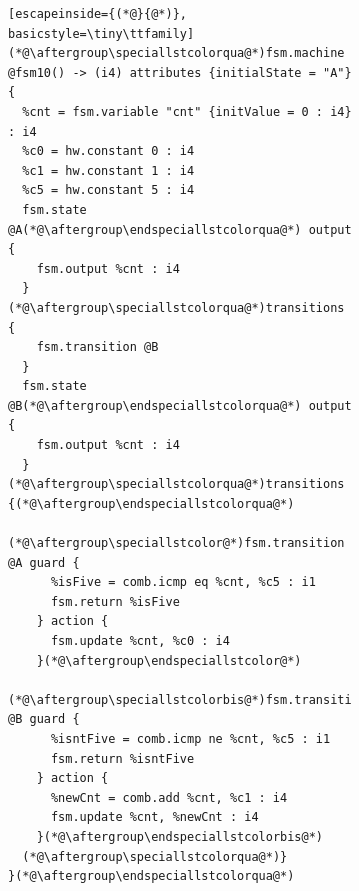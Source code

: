 \documentclass[acmsmall,screen,review]{acmart}
\begin{document}
\def\speciallstcolor{\begingroup\color{col1}}
\def\endspeciallstcolor{\endgroup}

\def\speciallstcolorbis{\begingroup\color{col2}}
\def\endspeciallstcolorbis{\endgroup}

\def\speciallstcolorter{\begingroup\color{col3}}
\def\endspeciallstcolorter{\endgroup}

\def\speciallstcolorqua{\begingroup\color{col4}}
\def\endspeciallstcolorqua{\endgroup}
\begin{figure}[h]
  
  \begin{subfigure}[T]{0.6\columnwidth}
\begin{lstlisting}[escapeinside={(*@}{@*)}, basicstyle=\tiny\ttfamily]
(*@\aftergroup\speciallstcolorqua@*)fsm.machine @fsm10() -> (i4) attributes {initialState = "A"} {
  %cnt = fsm.variable "cnt" {initValue = 0 : i4} : i4
  %c0 = hw.constant 0 : i4
  %c1 = hw.constant 1 : i4
  %c5 = hw.constant 5 : i4
  fsm.state @A(*@\aftergroup\endspeciallstcolorqua@*) output {
    fsm.output %cnt : i4
  } (*@\aftergroup\speciallstcolorqua@*)transitions { 
    fsm.transition @B
  }
  fsm.state @B(*@\aftergroup\endspeciallstcolorqua@*) output {
    fsm.output %cnt : i4
  } (*@\aftergroup\speciallstcolorqua@*)transitions {(*@\aftergroup\endspeciallstcolorqua@*)
    (*@\aftergroup\speciallstcolor@*)fsm.transition @A guard {
      %isFive = comb.icmp eq %cnt, %c5 : i1
      fsm.return %isFive
    } action {
      fsm.update %cnt, %c0 : i4
    }(*@\aftergroup\endspeciallstcolor@*)
    (*@\aftergroup\speciallstcolorbis@*)fsm.transition @B guard {
      %isntFive = comb.icmp ne %cnt, %c5 : i1
      fsm.return %isntFive
    } action {
      %newCnt = comb.add %cnt, %c1 : i4
      fsm.update %cnt, %newCnt : i4
    }(*@\aftergroup\endspeciallstcolorbis@*)
  (*@\aftergroup\speciallstcolorqua@*)}
}(*@\aftergroup\endspeciallstcolorqua@*)
\end{lstlisting}
\end{subfigure}
  \begin{subfigure}[T]{0.39\columnwidth}

\end{subfigure}
\end{figure}
\end{document}
